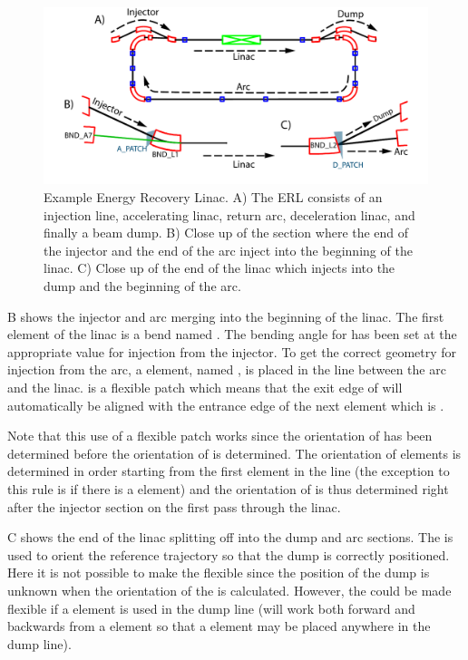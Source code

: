 \begin{figure}[tb]
  \centering
  \includegraphics[width=6in]{erl.pdf}
  \caption[Example Energy Recovery Linac.]{
Example Energy Recovery Linac. A) The ERL consists of an injection line, accelerating linac, return
arc, deceleration linac, and finally a beam dump. B) Close up of the section where the end of the
injector and the end of the arc inject into the beginning of the linac. C) Close up of the end of
the linac which injects into the dump and the beginning of the arc.}
  \label{f:erl}
\end{figure}

B shows the injector and arc merging into the beginning of the linac. The first element
of the linac is a bend named . The bending angle for  has been set at the
appropriate value for injection from the injector. To get the correct geometry for injection from
the arc, a  element, named , is placed in the  line between the arc
and the linac.  is a flexible patch which means that the exit edge of  will
automatically be aligned with the entrance edge of the next element which is .

Note that this use of a flexible patch works since the orientation of  has been
determined before the orientation of  is determined. The orientation of elements is
determined in order starting from the first element in the line (the exception to this rule is if
there is a  element) and the orientation of  is thus determined right
after the injector section on the first pass through the linac.

C shows the end of the linac splitting off into the dump and arc sections. The
 is used to orient the reference trajectory so that the dump is correctly positioned.
Here it is not possible to make the  flexible since the position of the dump is unknown
when the orientation of the  is calculated. However, the  could be made
flexible if a  element is used in the dump line (\bmad will work both forward and
backwards from a  element so that a  element may be placed
anywhere in the dump line).


